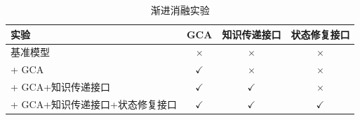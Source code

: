 
\begin{table}[htbp]
\centering
\caption{渐进消融实验}
\label{tab:ablation_chap3_local}
\small
\setlength{\tabcolsep}{6pt}
\renewcommand{\arraystretch}{1.18}
\begin{tabular}{@{}p{}ccc@{}}
\toprule
\textbf{实验} & \textbf{GCA} & \textbf{知识传递接口} & \textbf{状态修复接口} \\
\midrule
基准模型 & $\times$ & $\times$ & $\times$ \\
+ GCA & $\checkmark$ & $\times$ & $\times$ \\
+ GCA+知识传递接口 & $\checkmark$ & $\checkmark$ & $\times$ \\
+ GCA+知识传递接口+状态修复接口 & $\checkmark$ & $\checkmark$ & $\checkmark$ \\
\bottomrule
\end{tabular}
\end{table}





